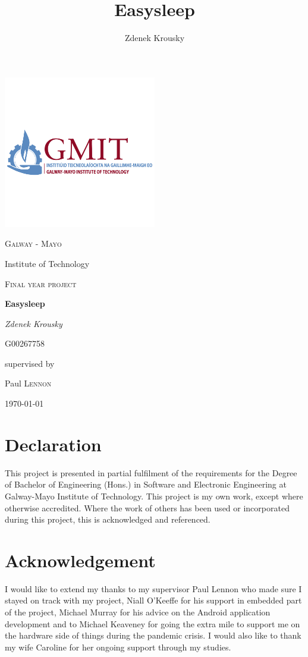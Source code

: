 \documentclass[12pt,a4paper]{article}
\author{Zdenek Krousky}
\title{Easysleep}
\begin{document}
	\begin{titlepage}
		\centering
		\includegraphics[width=0.5\textwidth]{gmit_full1.png}\par\vspace{0cm}
		{\scshape\LARGE Galway - Mayo \par Institute of Technology \par}
		\vspace{1cm}
		{\scshape\Large Final year project\par}
		\vspace{1.5cm}
		{\Huge\bfseries Easysleep\par}
		\vspace{2cm}
		{\Large\itshape Zdenek Krousky\par}
		{\Large G00267758\par}
		\vfill
		supervised by\par
		Paul \textsc{Lennon}
		
		\vfill
		
		{\large \today\par}
	\end{titlepage}
	
	\newpage
	\newpage
	
	\section*{Declaration}
	This project is presented in partial fulfilment of the requirements for the Degree of Bachelor of Engineering (Hons.) in Software and Electronic Engineering at Galway-Mayo Institute of Technology. This project is my own work, except where otherwise accredited. Where the work of others has been used or incorporated during this project, this is acknowledged and referenced.
	\newpage
	
	\section*{Acknowledgement}
	I would like to extend my thanks to my supervisor Paul Lennon who made sure I stayed on track with my project, Niall O'Keeffe for his support in embedded part of the project, Michael Murray for his advice on the Android application development and to Michael Keaveney for going the extra mile to support me on the hardware side of things during the pandemic crisis. I would also like to thank my wife Caroline for her ongoing support through my studies.
	\newpage
	
\end{document}
